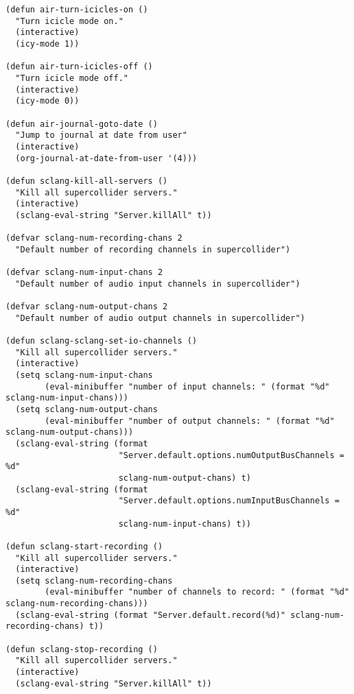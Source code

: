 \documentclass[11pt]{article}
\begin{document}
\begin{verbatim}
(defun air-turn-icicles-on ()
  "Turn icicle mode on."
  (interactive)
  (icy-mode 1))

(defun air-turn-icicles-off ()
  "Turn icicle mode off."
  (interactive)
  (icy-mode 0))

(defun air-journal-goto-date ()
  "Jump to journal at date from user"
  (interactive)
  (org-journal-at-date-from-user '(4)))

(defun sclang-kill-all-servers ()
  "Kill all supercollider servers."
  (interactive)
  (sclang-eval-string "Server.killAll" t))

(defvar sclang-num-recording-chans 2
  "Default number of recording channels in supercollider")

(defvar sclang-num-input-chans 2
  "Default number of audio input channels in supercollider")

(defvar sclang-num-output-chans 2
  "Default number of audio output channels in supercollider")

(defun sclang-sclang-set-io-channels ()
  "Kill all supercollider servers."
  (interactive)
  (setq sclang-num-input-chans
        (eval-minibuffer "number of input channels: " (format "%d" sclang-num-input-chans)))
  (setq sclang-num-output-chans
        (eval-minibuffer "number of output channels: " (format "%d" sclang-num-output-chans)))
  (sclang-eval-string (format
                       "Server.default.options.numOutputBusChannels = %d"
                       sclang-num-output-chans) t)
  (sclang-eval-string (format
                       "Server.default.options.numInputBusChannels = %d"
                       sclang-num-input-chans) t))

(defun sclang-start-recording ()
  "Kill all supercollider servers."
  (interactive)
  (setq sclang-num-recording-chans
        (eval-minibuffer "number of channels to record: " (format "%d" sclang-num-recording-chans)))
  (sclang-eval-string (format "Server.default.record(%d)" sclang-num-recording-chans) t))

(defun sclang-stop-recording ()
  "Kill all supercollider servers."
  (interactive)
  (sclang-eval-string "Server.killAll" t))


\end{verbatim}
\end{document}
